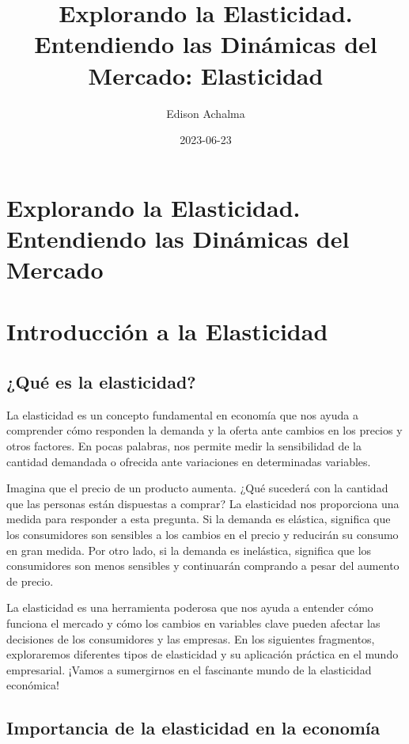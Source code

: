 \documentclass[
  jou,
  floatsintext,
  longtable,
  a4paper,
  nolmodern,
  notxfonts,
  notimes,
  colorlinks=true,linkcolor=blue,citecolor=blue,urlcolor=blue]{apa7}
\title{Explorando la Elasticidad. Entendiendo las Dinámicas del Mercado:
Elasticidad}
\author{Edison Achalma}
\affiliation{
{Escuela Profesional de Economía, Universidad Nacional de San Cristóbal
de Huamanga}}
\date{2023-06-23}
\begin{document}
\maketitle

\hypertarget{toc}{}
\tableofcontents
\newpage
\section[Introduction]{Explorando la Elasticidad. Entendiendo las
Dinámicas del Mercado}

\setcounter{secnumdepth}{-\maxdimen} %

\setlength\LTleft{0pt}


\section{Introducción a la
Elasticidad}\label{introducciuxf3n-a-la-elasticidad}

\subsection{¿Qué es la elasticidad?}\label{quuxe9-es-la-elasticidad}

La elasticidad es un concepto fundamental en economía que nos ayuda a
comprender cómo responden la demanda y la oferta ante cambios en los
precios y otros factores. En pocas palabras, nos permite medir la
sensibilidad de la cantidad demandada o ofrecida ante variaciones en
determinadas variables.

Imagina que el precio de un producto aumenta. ¿Qué sucederá con la
cantidad que las personas están dispuestas a comprar? La elasticidad nos
proporciona una medida para responder a esta pregunta. Si la demanda es
elástica, significa que los consumidores son sensibles a los cambios en
el precio y reducirán su consumo en gran medida. Por otro lado, si la
demanda es inelástica, significa que los consumidores son menos
sensibles y continuarán comprando a pesar del aumento de precio.

La elasticidad es una herramienta poderosa que nos ayuda a entender cómo
funciona el mercado y cómo los cambios en variables clave pueden afectar
las decisiones de los consumidores y las empresas. En los siguientes
fragmentos, exploraremos diferentes tipos de elasticidad y su aplicación
práctica en el mundo empresarial. ¡Vamos a sumergirnos en el fascinante
mundo de la elasticidad económica!

\subsection{Importancia de la elasticidad en la
economía}\label{importancia-de-la-elasticidad-en-la-economuxeda}
\end{document}
